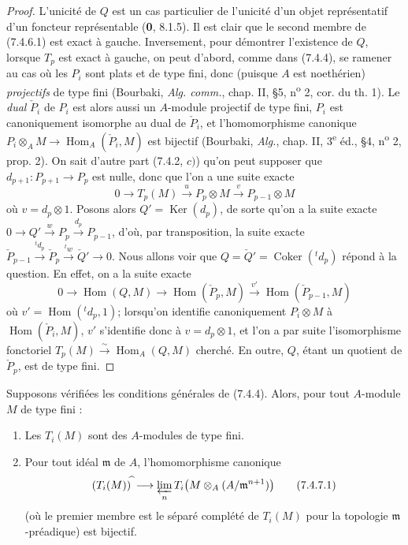 \begin{proof}
L'unicité de $Q$ est un cas particulier de l'unicité d'un objet représentatif
d'un foncteur représentable (\textbf{0}, 8.1.5). Il est clair que le second membre de
(7.4.6.1) est exact à gauche. Inversement, pour démontrer l'existence de $Q$,
lorsque $T_p$ est exact à gauche, on peut d'abord, comme dans (7.4.4), se
ramener au cas où les $P_i$ sont plats et de type fini, donc (puisque $A$ est
noethérien) \emph{projectifs} de type fini (Bourbaki, \emph{Alg. comm.}, chap. II,
\S 5, n\textsuperscript{o} 2, cor. du th. 1). Le \emph{dual} $\check P_i$ de $P_i$
est alors aussi un $A$-module projectif de type fini, $P_i$ est canoniquement
isomorphe au dual de $\check P_i$, et l'homomorphisme canonique
$P_i\otimes_A M\longrightarrow\operatorname{Hom}_A(\check P_i,M)$
est bijectif (Bourbaki, \emph{Alg.}, chap. II, 3\textsuperscript{e} éd.,
\S 4, n\textsuperscript{o} 2, prop. 2). On sait d'autre part (7.4.2, $c)$)
qu'on peut supposer que $d_{p+1}:P_{p+1}\to P_p$ est nulle, donc que l'on a une
suite exacte
\[
  0\longrightarrow T_p(M)\xrightarrow{u}P_p\otimes M
  \xrightarrow{v}P_{p-1}\otimes M
\]
où $v=d_p\otimes1$. Posons alors $Q'=\operatorname{Ker}(d_p)$, de sorte qu'on
a la suite exacte
$0\longrightarrow Q'\xrightarrow{w}P_p\xrightarrow{d_p}P_{p-1}$,
d'où, par transposition, la suite exacte
$\check P_{p-1}\xrightarrow{{}^t d_p}\check P_p
\xrightarrow{{}^t w}\check Q'\longrightarrow0$.
Nous allons voir que
$Q=\check Q'=\operatorname{Coker}({}^t d_p)$
répond à la question. En effet, on a la suite exacte
\[
  0\longrightarrow\operatorname{Hom}(Q,M)
  \longrightarrow\operatorname{Hom}(\check P_p,M)
  \xrightarrow{v'}\operatorname{Hom}(\check P_{p-1},M)
\]
où $v'=\operatorname{Hom}({}^t d_p,1)$; lorsqu'on identifie canoniquement
$P_i\otimes M$ à $\operatorname{Hom}(\check P_i,M)$, $v'$ s'identifie donc à
$v=d_p\otimes1$, et l'on a par suite l'isomorphisme fonctoriel
$T_p(M)\xrightarrow{\sim}\operatorname{Hom}_A(Q,M)$
cherché. En outre, $Q$, étant un quotient de $\check P_p$, est de type fini.
\end{proof}

\begin{proposition}[7.4.7]
Supposons vérifiées les conditions générales de \textup{(7.4.4)}. Alors, pour tout
$A$-module $M$ de type fini :
\begin{enumerate}
  \item[\textup{(i)}] Les $T_i(M)$ sont des $A$-modules de type fini.
  \item[\textup{(ii)}] Pour tout idéal $\mathfrak m$ de $A$, l'homomorphisme canonique
    \[
      (T_i(M))^{\widehat{\,}}
      \longrightarrow
      \varprojlim_n T_i\bigl(M\otimes_A(A/\mathfrak m^{n+1})\bigr)
      \tag{7.4.7.1}\label{III.7.4.7.1.fr}
    \]
    (où le premier membre est le séparé complété de $T_i(M)$ pour la topologie
    $\mathfrak m$-préadique) est bijectif.
\end{enumerate}
\end{proposition}

